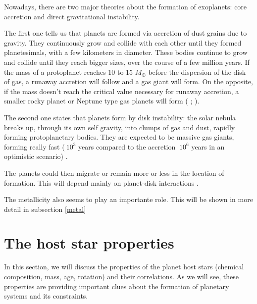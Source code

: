 \documentclass[dvips,12pt,a4paper]{report}
\begin{document}
Nowadays, there are two major theories about the formation of exoplanets: core accretion and direct gravitational instability. 

The first one tells us that planets are formed via accretion of dust grains due to gravity. They continuously grow and collide with each other until they formed planetesimals, with a few kilometers in diameter. These bodies continue to grow and collide until they reach bigger sizes, over the course of a few million years. If the mass of a protoplanet reaches 10 to 15 $M_{\oplus}$ before the dispersion of the disk of gas, a runaway accretion will follow and a gas giant will form. On the opposite, if the mass doesn't reach the critical value necessary for runaway accretion, a smaller rocky planet or Neptune type gas planets will form (\citeauthor{Pollack-1996} \citeyear{Pollack-1996}; \citeauthor{Alibert-2006} \citeyear{Alibert-2006}). 

The second one states that planets form by disk instability: the solar nebula breaks up, through its own self gravity, into clumps of gas and dust, rapidly forming protoplanetary bodies. They are expected to be massive gas giants, forming really fast ($~10^3$ years compared to the accretion $~10^6$ years in an optimistic scenario) \citep{Boss-1997}. 

The planets could then migrate or remain more or less in the location of formation. This will depend mainly on planet-disk interactions \citep{Trilling-1998}.

The metallicity also seems to play an importante role. This will be shown in more detail in subsection \ref{metal}

\section{The host star properties}

In this section, we will discuss the properties of the planet host stars (chemical composition, mass, age, rotation) and their correlations. As we will see, these properties are providing important clues about the formation of planetary systems and its constraints.
\end{document}
